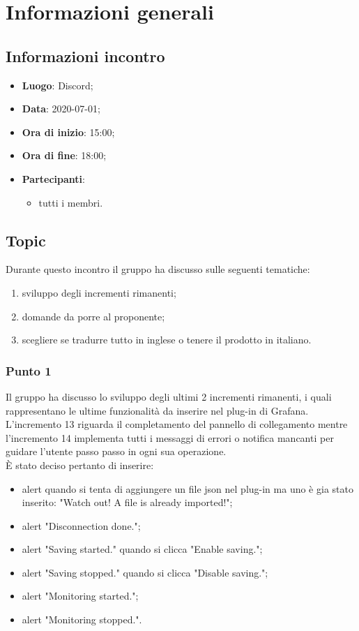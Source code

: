 \section{Informazioni generali}
\subsection{Informazioni incontro}
\begin{itemize}
\item \textbf{Luogo}: Discord;
\item \textbf{Data}: 2020-07-01;
\item \textbf{Ora di inizio}: 15:00;
\item \textbf{Ora di fine}: 18:00;
\item \textbf{Partecipanti}:
	\begin{itemize}
		\item tutti i membri.
	\end{itemize}
\end{itemize}

\subsection{Topic}
Durante questo incontro il gruppo ha discusso sulle seguenti tematiche:
\begin{enumerate}
\item sviluppo degli incrementi rimanenti;
\item domande da porre al proponente;
\item scegliere se tradurre tutto in inglese o tenere il prodotto in italiano.
\end{enumerate}

\subsubsection{Punto 1}
Il gruppo ha discusso lo sviluppo degli ultimi 2 incrementi rimanenti, i quali rappresentano le ultime funzionalità da inserire nel plug-in di Grafana\glo.
L'incremento 13 riguarda il completamento del pannello di collegamento mentre l'incremento 14 implementa tutti i messaggi di errori o notifica mancanti per guidare l'utente passo passo in ogni sua operazione. \\
È stato deciso pertanto di inserire: \begin{itemize}
\item alert quando si tenta di aggiungere un file json nel plug-in ma uno è gia stato inserito: "Watch out! A file is already imported!";
\item alert "Disconnection done.";
\item alert "Saving started." quando si clicca "Enable saving.";
\item alert "Saving stopped." quando si clicca "Disable saving.";
\item alert "Monitoring started.";
\item alert "Monitoring stopped.".
\end{itemize}

